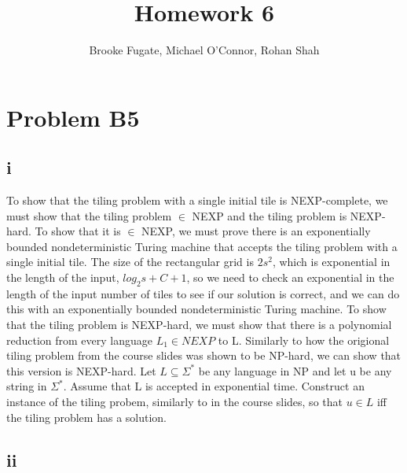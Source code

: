 \documentclass[12pt]{article}
\begin{document}
\pagestyle{plain}
\titleformat{\subsection}[runin]
  {\normalfont\large\bfseries}{\thesubsection}{1em}{}
\titleformat{\subsubsection}[runin]
  {\bfseries}{}{1em}{}

\title{Homework 6}
\author{Brooke Fugate, Michael O'Connor, Rohan Shah}
\date{}

\maketitle

\section*{Problem B5}
\subsection*{i}
To show that the tiling problem with a single initial tile is NEXP-complete, we must show that the tiling problem $\in$ NEXP and the tiling problem is NEXP-hard. To show that it is $\in$ NEXP, we must prove there is an exponentially bounded nondeterministic Turing machine that accepts the tiling problem with a single initial tile. The size of the rectangular grid is $2s^2$, which is exponential in the length of the input, $log_2s+C+1$, so we need to check an exponential in the length of the input number of tiles to see if our solution is correct, and we can do this with an exponentially bounded nondeterministic Turing machine.
To show that the tiling problem is NEXP-hard, we must show that there is a polynomial reduction from every language $L_1 \in NEXP$ to L. Similarly to how the origional tiling problem from the course slides was shown to be NP-hard, we can show that this version is NEXP-hard.  Let $L \subseteq \Sigma^*$ be any language in NP and let u be any string in $\Sigma^*$. Assume that L is accepted in exponential time.  Construct an instance of the tiling probem, similarly to in the course slides, so that $u \in L$ iff the tiling problem has a solution.

\subsection*{ii} 
\end{document}
